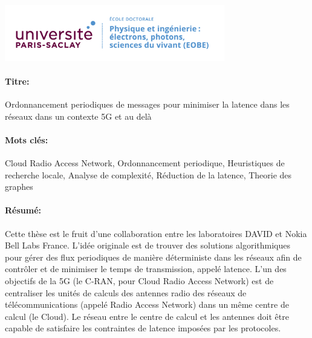 \lhead{}
\rhead{}
\rfoot{}
\cfoot{}
\lfoot{}

\noindent 
\includegraphics[height=2.45cm]{EOBE}
\vspace{1cm}
\begin{mdframed}[linecolor=Prune,linewidth=1]
\vspace{-.25cm}
\paragraph*{Titre:} Ordonnancement periodiques de messages pour minimiser la latence dans les réseaux dans un contexte 5G et au delà

\begin{small}
\vspace{-.25cm}
\paragraph*{Mots clés:}  Cloud Radio Access Network, Ordonnancement periodique, Heuristiques de recherche locale, Analyse de complexité, Réduction de la latence, Theorie des graphes

\vspace{-.5cm}
\begin{multicols}{2}
\paragraph*{Résumé:} Cette thèse est le fruit d’une collaboration entre les laboratoires DAVID et Nokia Bell Labs France.
L’idée originale est de trouver des solutions algorithmiques pour gérer des flux periodiques de manière déterministe dans les réseaux afin de contrôler et de minimiser le temps de transmission, appelé latence. L’un des objectifs de la 5G (le C-RAN, pour Cloud Radio Access Network) est de centraliser les unités de calculs des antennes radio des réseaux de télécommunications (appelé Radio Access Network) dans un même centre de calcul (le Cloud). Le réseau entre le centre de calcul et les antennes doit être capable de satisfaire les contraintes de latence imposées par les protocoles.


\end{multicols}
\end{small}
\end{mdframed}
